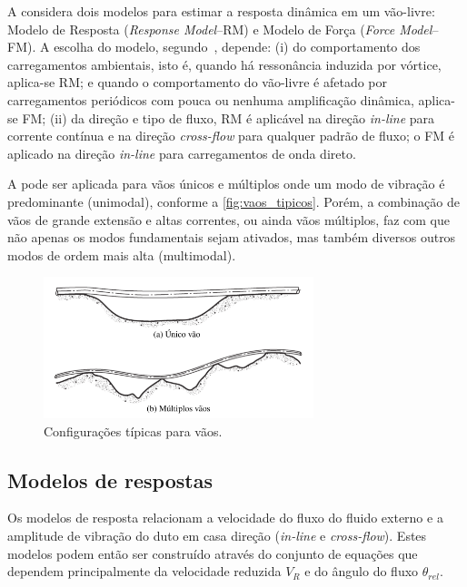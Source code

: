 A  considera dois modelos para estimar a resposta dinâmica em um vão-livre: Modelo de Resposta (\textit{Response Model}--RM) e Modelo de Força (\textit{Force Model}--FM).
A escolha do modelo, segundo~, depende: (i) do comportamento dos carregamentos ambientais, isto é, quando há ressonância induzida por vórtice, aplica-se RM\@; e quando o comportamento do vão-livre é afetado por carregamentos periódicos com pouca ou nenhuma amplificação dinâmica, aplica-se FM\@; (ii) da direção e tipo de fluxo, RM é aplicável na direção \textit{in-line} para corrente contínua e na direção \textit{cross-flow} para qualquer padrão de fluxo; o FM é aplicado na direção \textit{in-line} para carregamentos de onda direto.

A  pode ser aplicada para vãos únicos e múltiplos onde um modo de vibração é predominante (unimodal), conforme a \autoref{fig:vaos_tipicos}.
Porém, a combinação de vãos de grande extensão e altas correntes, ou ainda vãos múltiplos, faz com que não apenas os modos fundamentais sejam ativados, mas também diversos outros modos de ordem mais alta (multimodal).

\begin{figure}[!ht]
	\centering
    \caption{Configurações típicas para vãos.}\label{fig:vaos_tipicos}
	\includegraphics[width=0.7\textwidth]{imagens/vaos_tipicos}
\end{figure}

\pagebreak
\subsection{Modelos de respostas}

Os modelos de resposta relacionam a velocidade do fluxo do fluido externo e a amplitude de vibração do duto em casa direção (\textit{in-line} e \textit{cross-flow}). Estes modelos podem então ser construído através do conjunto de equações que dependem principalmente da velocidade reduzida $V_R$ e do ângulo do fluxo $\theta_\mathit{rel}$.

